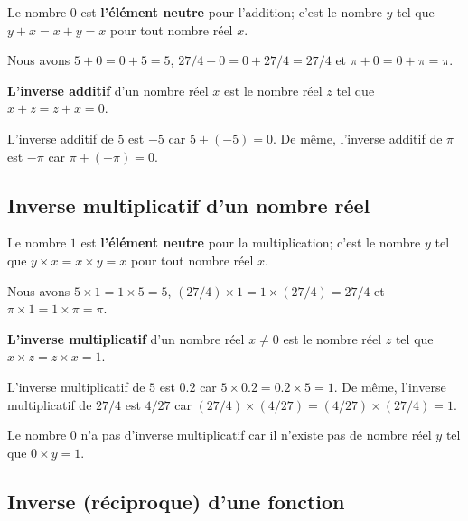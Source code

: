 {Le nombre $0$ est {\bfseries l'élément neutre} 
pour l'addition; c'est le nombre $y$ tel que $y + x = x + y = x$ pour
tout nombre réel $x$.

\begin{egg} Nous avons $5+0=0+5=5$, $27/4 + 0 = 0 + 27/4 = 27/4$ et
$\pi+0 = 0 + \pi = \pi$.
\end{egg}

{\bfseries L'inverse additif}  
d'un nombre réel $x$ est le nombre réel $z$ tel que $x+z = z+x =0$.

\begin{egg} L'inverse additif de $5$ est $-5$ car $5 + (-5) = 0$.  De même,
l'inverse additif de $\pi$ est $-\pi$ car $\pi + (-\pi) = 0$.
\end{egg}

\subsection{Inverse multiplicatif d'un nombre réel}

Le nombre $1$ est {\bfseries l'élément neutre} 
pour la multiplication; c'est le nombre $y$ tel que $y \times x = x
\times y = x$ pour tout nombre réel $x$.

\begin{egg}
Nous avons $5\times 1= 1\times 5 = 5$,
$(27/4) \times 1 = 1 \times (27/4) = 27/4$
et $\pi \times 1 = 1 \times \pi = \pi$.
\end{egg}

{\bfseries L'inverse multiplicatif}
d'un nombre réel $x \neq 0$ est le nombre réel $z$ tel que
$x \times z = z \times x = 1$.

\begin{egg}
L'inverse multiplicatif de $5$ est $0.2$ car
$5 \times 0.2 = 0.2 \times 5 = 1$.  De même, l'inverse multiplicatif
de $27/4$ est $4/27$ car $(27/4) \times (4/27) = (4/27) \times (27/4) = 1$.
\end{egg}

\begin{rmk}
Le nombre $0$ n'a pas d'inverse multiplicatif car il n'existe pas de
nombre réel $y$ tel que $0 \times y = 1$.
\end{rmk}

\subsection{Inverse (réciproque) d'une fonction}

}
